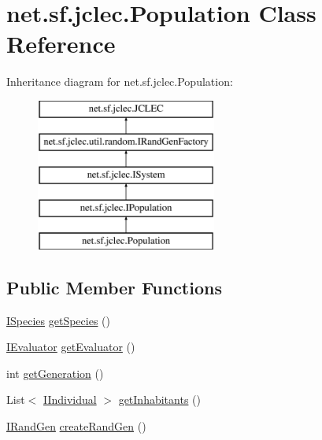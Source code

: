 \hypertarget{classnet_1_1sf_1_1jclec_1_1_population}{\section{net.\-sf.\-jclec.\-Population Class Reference}
\label{classnet_1_1sf_1_1jclec_1_1_population}
}
Inheritance diagram for net.\-sf.\-jclec.\-Population\-:\begin{figure}[H]
\begin{center}
\leavevmode
\includegraphics[height=5.000000cm]{classnet_1_1sf_1_1jclec_1_1_population}
\end{center}
\end{figure}
\subsection*{Public Member Functions}
\begin{DoxyCompactItemize}
\item 
\hyperlink{interfacenet_1_1sf_1_1jclec_1_1_i_species}{I\-Species} \hyperlink{classnet_1_1sf_1_1jclec_1_1_population_a264eeb7f5b84566b0936fa5603cc1cd7}{get\-Species} ()
\item 
\hyperlink{interfacenet_1_1sf_1_1jclec_1_1_i_evaluator}{I\-Evaluator} \hyperlink{classnet_1_1sf_1_1jclec_1_1_population_a4604a5f5150f3907fc5119260f1cfcec}{get\-Evaluator} ()
\item 
int \hyperlink{classnet_1_1sf_1_1jclec_1_1_population_a387250a2ae861d921b730eeb863fb82e}{get\-Generation} ()
\item 
List$<$ \hyperlink{interfacenet_1_1sf_1_1jclec_1_1_i_individual}{I\-Individual} $>$ \hyperlink{classnet_1_1sf_1_1jclec_1_1_population_a0a8b5dae0fdead702efa0df8d4d3186e}{get\-Inhabitants} ()
\item 
\hyperlink{interfacenet_1_1sf_1_1jclec_1_1util_1_1random_1_1_i_rand_gen}{I\-Rand\-Gen} \hyperlink{classnet_1_1sf_1_1jclec_1_1_population_a8427e4459d5f7554337a654b363d9714}{create\-Rand\-Gen} ()
\end{DoxyCompactItemize}
